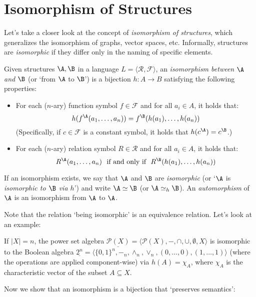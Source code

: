 \section{Isomorphism of Structures}\label{section:isomorphism-of-structures}

Let's take a closer look at the concept of \emph{isomorphism of structures}, which generalizes the isomorphism of graphs, vector spaces, etc. Informally, structures are \emph{isomorphic} if they differ only in the naming of specific elements.

\begin{definition}
Given structures $\A, \B$ in a language $L = \langle\mathcal{R}, \mathcal{F}\rangle$, an \emph{isomorphism between $\A$ and $\B$} (or `from $\A$ to $\B$') is a bijection $h\colon A \to B$ satisfying the following properties:
\begin{itemize}
    \item For each ($n$-ary) function symbol $f \in \mathcal{F}$ and for all $a_i \in A$, it holds that:
    $$
    h(f^\A(a_1, \dots, a_n)) = f^\B(h(a_1), \dots, h(a_n))
    $$
    (Specifically, if $c \in \mathcal{F}$ is a constant symbol, it holds that $h(c^\A) = c^\B$.)
    \item For each ($n$-ary) relation symbol $R \in \mathcal{R}$ and for all $a_i \in A$, it holds that:
    $$
    R^\A(a_1, \dots, a_n)\ \text{ if and only if }\ R^\B(h(a_1), \dots, h(a_n))
    $$
\end{itemize}
If an isomorphism exists, we say that $\A$ and $\B$ are \emph{isomorphic} (or `$\A$ is \emph{isomorphic to $\B$ via $h$}') and write $\A \simeq \B$ (or $\A \simeq_h \B$). An \emph{automorphism} of $\A$ is an isomorphism from $\A$ to $\A$.
\end{definition}

Note that the relation `being isomorphic' is an equivalence relation. Let's look at an example:

\begin{example}
    If $|X| = n$, the power set algebra $\underline{\mathcal{P}(X)} = \langle \mathcal{P}(X), -, \cap, \cup, \emptyset, X\rangle$ is isomorphic to the Boolean algebra $\underline{2^n} = \langle \{0,1\}^n, -_n, \land_n, \lor_n, (0, \dots, 0), (1, \dots, 1)\rangle$ (where the operations are applied component-wise) via $h(A) = \chi_A$, where $\chi_A$ is the characteristic vector of the subset $A \subseteq X$.
\end{example}

Now we show that an isomorphism is a bijection that `preserves semantics':

